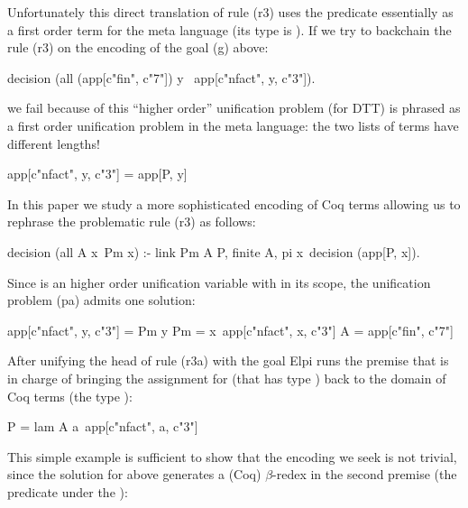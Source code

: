 \documentclass[sigconf,natbib=false]{acmart}
\begin{document}
\noindent
Unfortunately this direct translation of rule (r3) uses the
predicate  essentially as a first order term for the meta
language (its type is ).
If we try to backchain the rule (r3) on the encoding of the goal (g) above:
  
\begin{elpicode}
decision (all (app[c"fin", c"7"]) y\                 %
  app[c"nfact", y, c"3"]).
\end{elpicode}

\noindent
we fail because of this ``higher order'' unification problem (for DTT)
is phrased as a first order unification problem in the meta language:
the two lists of terms have different lengths!

\begin{elpicode}
app[c"nfact", y, c"3"] = app[P, y]                   %
\end{elpicode}

\noindent
In this paper we study a more sophisticated encoding of Coq terms allowing
us to rephrase the problematic rule (r3) as follows:

\begin{elpicode}
decision (all A x\ Pm x) :- link Pm A P, finite A,   %
  pi x\ decision (app[P, x]).
\end{elpicode}

\noindent
Since  is an higher order unification variable with 
in its scope, the unification problem (pa) admits one solution:

\begin{elpicode}
app[c"nfact", y, c"3"] = Pm y                       %
Pm = x\ app[c"nfact", x, c"3"]       %
A = app[c"fin", c"7"]                %
\end{elpicode}
  
\noindent
After unifying the head of rule (r3a) with the goal Elpi runs
the premise  that is in charge of bringing the
assignment for  (that has type )
back to the domain of Coq terms (the type ):

\begin{elpicode}
P = lam A a\ app[c"nfact", a, c"3"]
\end{elpicode}

\noindent
This simple example is sufficient to show that the encoding we seek
is not trivial, since the solution for  above generates a
(Coq) $\beta$-redex in the second premise (the predicate
under the \hspace{-0.8em}):
\end{document}
